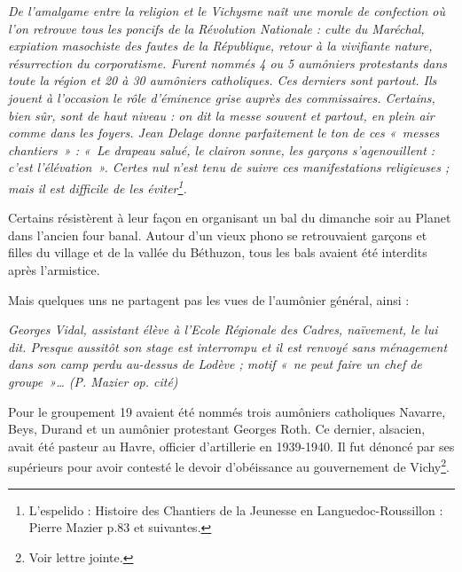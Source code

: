 \emph{De l’amalgame entre la religion et le Vichysme naît une morale de confection où
l’on retrouve tous les poncifs de la Révolution Nationale : culte du Maréchal,
expiation masochiste des fautes de la République, retour à la vivifiante nature,
résurrection du corporatisme. Furent nommés 4 ou 5 aumôniers protestants dans
toute la région et 20 à 30 aumôniers catholiques. Ces derniers sont partout. Ils
jouent à l’occasion le rôle d’éminence grise auprès des commissaires. Certains, bien
sûr, sont de haut niveau : on dit la messe souvent et partout, en plein air comme
dans les foyers. Jean Delage donne parfaitement le ton de ces «~messes chantiers~» :
«~Le drapeau salué, le clairon sonne, les garçons s’agenouillent : c’est l’élévation~».
Certes nul n’est tenu de suivre ces manifestations religieuses ; mais il est difficile de
les éviter\footnote{L’espelido : Histoire des Chantiers de la Jeunesse en Languedoc-Roussillon : Pierre
Mazier p.83 et suivantes.}.}

Certains résistèrent à leur façon en organisant un bal du dimanche soir au Planet dans l’ancien four
banal. Autour d’un vieux phono se retrouvaient garçons et filles du village et de la vallée du
Béthuzon, tous les bals avaient été interdits après l’armistice.

Mais quelques uns ne partagent pas les vues de l’aumônier général, ainsi :

\emph{Georges Vidal, assistant élève à l’Ecole Régionale des Cadres, naïvement, le lui dit. Presque
aussitôt son stage est interrompu et il est renvoyé sans ménagement dans son camp perdu au-dessus
de Lodève ; motif «~ne peut faire un chef de groupe~»… (P. Mazier op. cité)}

Pour le groupement 19 avaient été nommés trois aumôniers catholiques Navarre,
Beys, Durand et un aumônier protestant Georges Roth. Ce dernier, alsacien, avait été
pasteur au Havre, officier d’artillerie en 1939-1940. Il fut dénoncé par ses supérieurs
pour avoir contesté le devoir d’obéissance au gouvernement de Vichy\footnote{Voir lettre jointe.}.

